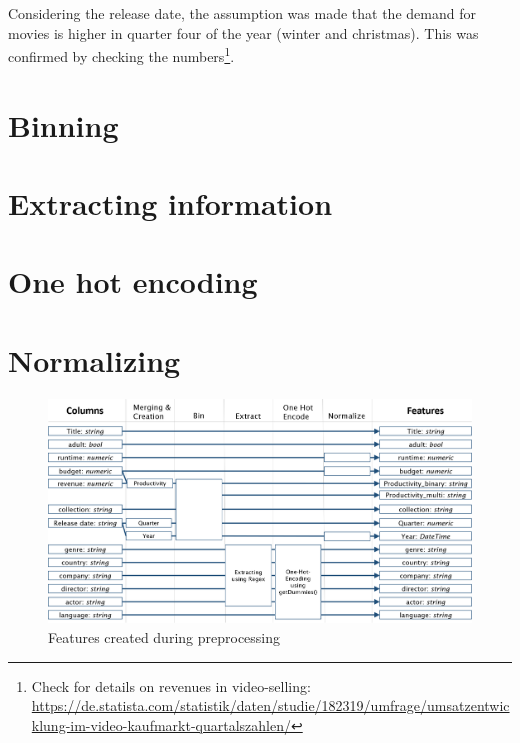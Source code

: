 Considering the release date, the assumption was made that the demand for movies is higher in quarter four of the year (winter and christmas). This was confirmed by checking the numbers\footnote{Check for details on revenues in video-selling: \hyperref{https://de.statista.com/statistik/daten/studie/182319/umfrage/umsatzentwicklung-im-video-kaufmarkt-quartalszahlen/}{link}{Statista revenue movies}{https://de.statista.com/statistik/daten/studie/182319/umfrage/umsatzentwicklung-im-video-kaufmarkt-quartalszahlen/}}.



\section{Binning}

\section{Extracting information}

\section{One hot encoding}

\section{Normalizing}

\begin{figure}
\includegraphics[width=\textwidth]{images/3_features.png}
\caption{Features created during preprocessing}
\label{img:features}
\end{figure}


